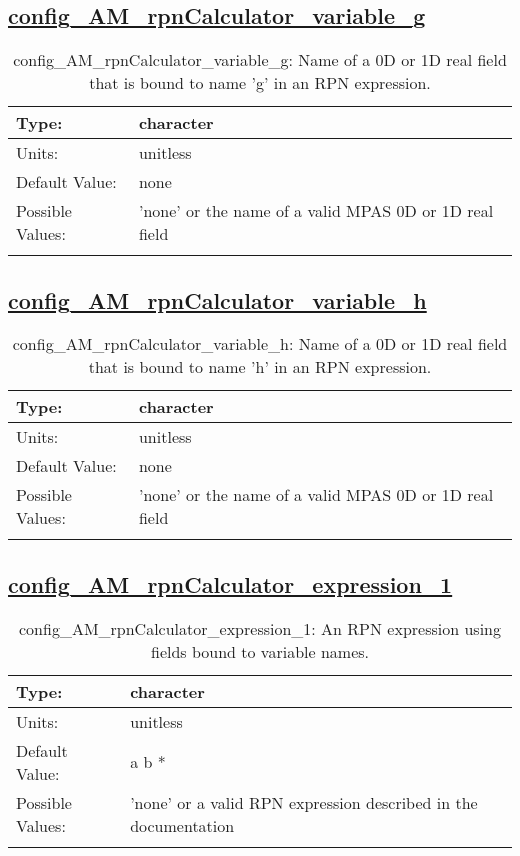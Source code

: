 \subsection[config\_AM\_rpnCalculator\_variable\_g]{\hyperref[sec:nm_tab_AM_rpnCalculator]{config\_AM\_rpnCalculator\_variable\_g}}
\label{subsec:nm_sec_config_AM_rpnCalculator_variable_g}
\begin{center}
\begin{longtable}{| p{2.0in} || p{4.0in} |}
    \hline
    Type: & character \\
    \hline
    Units: & \si{unitless} \\
    \hline
    Default Value: & none \\
    \hline
    Possible Values: & 'none' or the name of a valid MPAS 0D or 1D real field \\
    \hline
    \caption{config\_AM\_rpnCalculator\_variable\_g: Name of a 0D or 1D real field that is bound to name 'g' in an RPN expression.}
\end{longtable}
\end{center}
\subsection[config\_AM\_rpnCalculator\_variable\_h]{\hyperref[sec:nm_tab_AM_rpnCalculator]{config\_AM\_rpnCalculator\_variable\_h}}
\label{subsec:nm_sec_config_AM_rpnCalculator_variable_h}
\begin{center}
\begin{longtable}{| p{2.0in} || p{4.0in} |}
    \hline
    Type: & character \\
    \hline
    Units: & \si{unitless} \\
    \hline
    Default Value: & none \\
    \hline
    Possible Values: & 'none' or the name of a valid MPAS 0D or 1D real field \\
    \hline
    \caption{config\_AM\_rpnCalculator\_variable\_h: Name of a 0D or 1D real field that is bound to name 'h' in an RPN expression.}
\end{longtable}
\end{center}
\subsection[config\_AM\_rpnCalculator\_expression\_1]{\hyperref[sec:nm_tab_AM_rpnCalculator]{config\_AM\_rpnCalculator\_expression\_1}}
\label{subsec:nm_sec_config_AM_rpnCalculator_expression_1}
\begin{center}
\begin{longtable}{| p{2.0in} || p{4.0in} |}
    \hline
    Type: & character \\
    \hline
    Units: & \si{unitless} \\
    \hline
    Default Value: & a b * \\
    \hline
    Possible Values: & 'none' or a valid RPN expression described in the documentation \\
    \hline
    \caption{config\_AM\_rpnCalculator\_expression\_1: An RPN expression using fields bound to variable names.}
\end{longtable}
\end{center}
